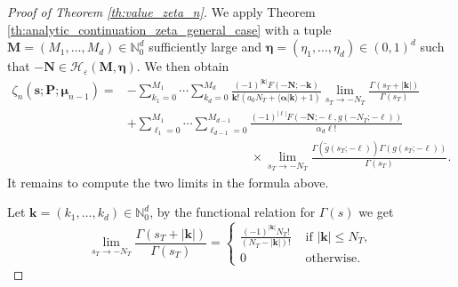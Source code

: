 \documentclass[a4paper,12pt]{article}
\theoremstyle{definition}
\numberwithin{equation}{section}
\begin{document}
\begin{proof}[Proof of Theorem \ref{th:value_zeta_n}]
We apply Theorem \ref{th:analytic_continuation_zeta_general_case} with a tuple $\mathbf{M}=(M_1,\ldots,M_d)\in \mathbb{N}_0^d$ sufficiently large and $\boldsymbol{\eta}=(\eta_1,\ldots,\eta_d) \in (0,1)^d$ such that $-\mathbf{N} \in \mathcal{H}_{\varepsilon}(\mathbf{M},\boldsymbol{\eta})$. We then obtain
\begin{align*}
    \zeta_{n}(\mathbf{s};\mathbf{P};\boldsymbol{\mu}_{n-1})=& -\sum_{k_1=0}^{M_1} \cdots \sum_{k_d=0}^{M_d}  \frac{(-1)^{|\mathbf{k}|}F(-\mathbf{N};-\mathbf{k})}{\mathbf{k}!(a_0N_T+\langle \boldsymbol{\alpha}|\mathbf{k}\rangle+1)}\lim_{s_T \to -N_T}\frac{\Gamma(s_T+|\mathbf{k}|)}{\Gamma(s_T)} \\ 
    & +\sum_{\ell_1=0}^{M_1} \cdots \sum_{\ell_{d-1}=0}^{M_{d-1}} \frac{(-1)^{|\boldsymbol{\ell}|}F(-\mathbf{N};-\boldsymbol{\ell},g(-N_T;-\boldsymbol{\ell}))}{\alpha_d\boldsymbol{\ell}!} \\
    & \hspace{119pt} \times \lim_{s_T \to -N_T}\frac{\Gamma(\widetilde{g}(s_T;-\boldsymbol{\ell}))\Gamma(g(s_T;-\boldsymbol{\ell}))}{\Gamma(s_T)}.
\end{align*} 
It remains to compute the two limits in the formula above.

Let $\mathbf{k}=(k_1,\ldots,k_d) \in \mathbb{N}_0^d$, by the functional relation for $\Gamma(s)$ we get
\[
    \lim_{s_T \to -N_T} \frac{\Gamma(s_T+|\mathbf{k}|)}{\Gamma(s_T)} =
    \begin{cases}
        \frac{(-1)^{|\mathbf{k}|}N_T!}{(N_T-|\mathbf{k}|)!} & \text{ if } |\mathbf{k}| \leq N_T, \\
        0 &\text{ otherwise.}
    \end{cases}
\]


\end{proof}
\end{document}
